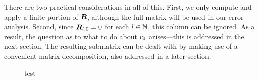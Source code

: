 There are two practical considerations in all of this. First, we only
compute and apply a finite portion of $\boldsymbol{R}$, although the full
matrix will be used in our error analysis. Second, since
$\boldsymbol{R}_{l,0} = 0$ for each $l\in\mathbb{N}$, this column can be ignored. As a
result, the question as to what to do about ${c}_{0}$
arises---this is addressed in the next section. The resulting
submatrix can be dealt with by making use of a convenient matrix
decomposition, also addressed in a later section.

\begin{figure}[h]
  \centering
  
  \caption{test}\label{fig:errorbound}
\end{figure}

